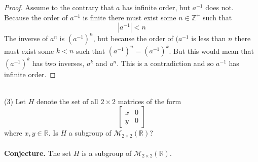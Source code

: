 \documentclass[11pt,a4paper]{article}
\begin{document}
\begin{proof}
Assume to the contrary that $a$ has infinite order, but $a^{-1}$ does not. Because the order of $a^{-1}$ is finite there must exist some $n\in\mathbb{Z}^+$ such that
\begin{equation}\label{f1}
|a^{-1}| < n
\end{equation}
The inverse of $a^n$ is $(a^{-1})^n$, but because the order of $(a^{-1}$ is less than $n$ there must exist some $k<n$ such that $(a^{-1})^n=(a^{-1})^k$. But this would mean that $(a^{-1})^k$ has two inverses, $a^k$ and $a^n$. This is a contradiction and so $a^{-1}$ has infinite order.
\end{proof}
~\\
(3) Let $H$ denote the set of all $2 \times 2$ matrices of the form
\[\begin{bmatrix}
x&0\\
y&0
\end{bmatrix}\]
where $x,y\in\mathbb{R}$. Is $H$ a subgroup of $\mathcal{M}_{2\times 2}(\mathbb{R})$?\\
~\\
{\bf Conjecture.} The set $H$ is a subgroup of $\mathcal{M}_{2\times 2}(\mathbb{R})$.
\end{document}
